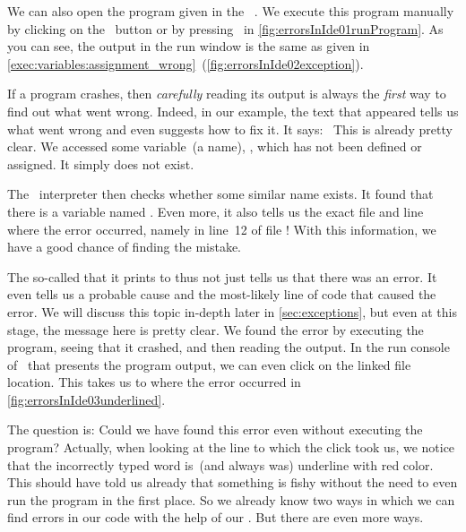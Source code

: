 We can also open the program  given in the \pycharm\ .
We execute this program manually by clicking on the \pycharmRun\ button or by pressing~ in \cref{fig:errorsInIde01runProgram}.
As you can see, the output in the run window is the same as given in \cref{exec:variables:assignment_wrong}~(\cref{fig:errorsInIde02exception}).

If a program crashes, then \emph{carefully} reading its output is always the \emph{first} way to find out what went wrong.
Indeed, in our example, the text that appeared tells us what went wrong and even suggests how to fix it.
It says:~\emph{}
This is already pretty clear.
We accessed some variable~(a name), , which has not been defined or assigned.
It simply does not exist.

The \python\ interpreter then checks whether some similar name exists.
It found that there is a variable named .
Even more, it also tells us the exact file and line where the error occurred, namely in line~12 of file !
With this information, we have a good chance of finding the mistake.

The so-called   that it prints to  thus not just tells us that there was an error.
It even tells us a probable cause and the most-likely line of code that caused the error.
We will discuss this topic in-depth later in \cref{sec:exceptions}, but even at this stage, the message here is pretty clear.%
%
%
%
\endhsection%
%
%
%
We found the error by executing the program, seeing that it crashed, and then reading the output.
In the run console of \pycharm\ that presents the program output, we can even click on the linked file location.
This takes us to where the error occurred in \cref{fig:errorsInIde03underlined}.

The question is:
Could we have found this error even without executing the program?
Actually, when looking at the line to which the click took us, we notice that the incorrectly typed word is~(and always was) underline with red color.
This should have told us already that something is fishy without the need to even run the program in the first place.%
%
%
%
So we already know two ways in which we can find errors in our code with the help of our .
But there are even more ways.

